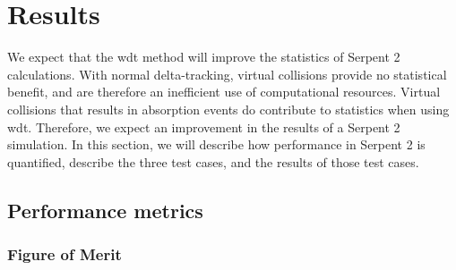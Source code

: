 \chapter{Results}
\label{chap:results}
We expect that the \gls{wdt} method will improve the statistics of
Serpent 2 calculations. With normal delta-tracking, virtual collisions
provide no statistical benefit, and are therefore an inefficient use
of computational resources. Virtual collisions that results in
absorption events do contribute to statistics when using
\gls{wdt}. Therefore, we expect an improvement in the results of a
Serpent 2 simulation. In this section, we will describe how
performance in Serpent 2 is quantified, describe the three test cases,
and the results of those test cases.

\section{Performance metrics}
\label{sec:fom}

\subsection{Figure of Merit}
\label{sec:fom}

